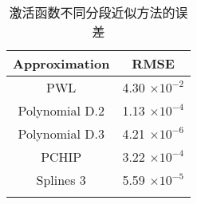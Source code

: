 
\begin{center}
\begin{table}
	\caption{激活函数不同分段近似方法的误差}
	\renewcommand\arraystretch{1.2}
	\setlength{\tabcolsep}{60pt}
	\begin{tabular}{cc}
		\toprule
		Approximation			&				RMSE		\\	\midrule
		PWL						&				4.30 \(\times 10^{-2}\)		 	\\	
		Polynomial D.2			&				1.13 \(\times 10^{-4}\)			\\
		Polynomial D.3			&				4.21 \(\times 10^{-6}\)			\\
		PCHIP					&				3.22 \(\times 10^{-4}\)			\\
		Splines 3				&				5.59 \(\times 10^{-5}\)			\\
	\bottomrule
	\label{tab:activation}
	\end{tabular}
\end{table}
\end{center}
